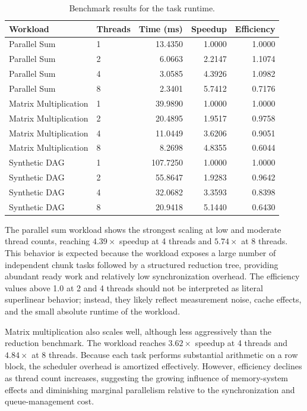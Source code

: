 \documentclass[10pt]{article}
\begin{document}
\begin{table}[h]
    \centering
    \small
    \begin{tabular}{llrrr}
        \toprule
        Workload & Threads & Time (ms) & Speedup & Efficiency \\
        \midrule
        Parallel Sum & 1 & 13.4350 & 1.0000 & 1.0000 \\
        Parallel Sum & 2 & 6.0663 & 2.2147 & 1.1074 \\
        Parallel Sum & 4 & 3.0585 & 4.3926 & 1.0982 \\
        Parallel Sum & 8 & 2.3401 & 5.7412 & 0.7176 \\
        \midrule
        Matrix Multiplication & 1 & 39.9890 & 1.0000 & 1.0000 \\
        Matrix Multiplication & 2 & 20.4895 & 1.9517 & 0.9758 \\
        Matrix Multiplication & 4 & 11.0449 & 3.6206 & 0.9051 \\
        Matrix Multiplication & 8 & 8.2698 & 4.8355 & 0.6044 \\
        \midrule
        Synthetic DAG & 1 & 107.7250 & 1.0000 & 1.0000 \\
        Synthetic DAG & 2 & 55.8647 & 1.9283 & 0.9642 \\
        Synthetic DAG & 4 & 32.0682 & 3.3593 & 0.8398 \\
        Synthetic DAG & 8 & 20.9418 & 5.1440 & 0.6430 \\
        \bottomrule
    \end{tabular}
    \caption{Benchmark results for the task runtime.}
    \label{tab:results}
\end{table}

The parallel sum workload shows the strongest scaling at low and moderate thread counts, reaching $4.39\times$ speedup at 4 threads and $5.74\times$ at 8 threads. This behavior is expected because the workload exposes a large number of independent chunk tasks followed by a structured reduction tree, providing abundant ready work and relatively low synchronization overhead. The efficiency values above 1.0 at 2 and 4 threads should not be interpreted as literal superlinear behavior; instead, they likely reflect measurement noise, cache effects, and the small absolute runtime of the workload.

Matrix multiplication also scales well, although less aggressively than the reduction benchmark. The workload reaches $3.62\times$ speedup at 4 threads and $4.84\times$ at 8 threads. Because each task performs substantial arithmetic on a row block, the scheduler overhead is amortized effectively. However, efficiency declines as thread count increases, suggesting the growing influence of memory-system effects and diminishing marginal parallelism relative to the synchronization and queue-management cost.
\end{document}
